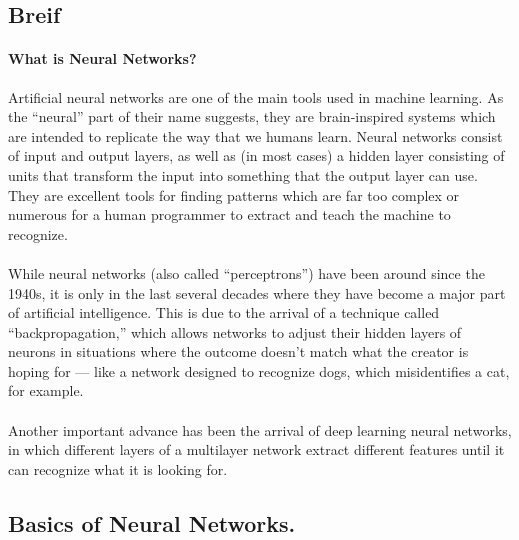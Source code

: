 
\subsection{Breif}
\paragraph{What is Neural Networks?}
Artificial neural networks are one of the main tools used in machine learning. As the “neural” part of their name suggests, they are brain-inspired systems which are intended to replicate the way that we humans learn. Neural networks consist of input and output layers, as well as (in most cases) a hidden layer consisting of units that transform the input into something that the output layer can use. They are excellent tools for finding patterns which are far too complex or numerous for a human programmer to extract and teach the machine to recognize.

\paragraph{}
While neural networks (also called “perceptrons”) have been around since the 1940s, it is only in the last several decades where they have become a major part of artificial intelligence. This is due to the arrival of a technique called “backpropagation,” which allows networks to adjust their hidden layers of neurons in situations where the outcome doesn’t match what the creator is hoping for — like a network designed to recognize dogs, which misidentifies a cat, for example.

\paragraph{}
Another important advance has been the arrival of deep learning neural networks, in which different layers of a multilayer network extract different features until it can recognize what it is looking for.

\subsection{Basics of Neural Networks.}
